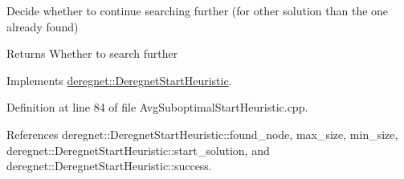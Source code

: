 Decide whether to continue searching further (for other solution than the one already found) 

\begin{DoxyReturn}{Returns}
Whether to search further 
\end{DoxyReturn}


Implements \hyperlink{classderegnet_1_1DeregnetStartHeuristic_ac3ee2c3022512f9d4ec7a6b49358e60a}{deregnet\+::\+Deregnet\+Start\+Heuristic}.



Definition at line 84 of file Avg\+Suboptimal\+Start\+Heuristic.\+cpp.



References deregnet\+::\+Deregnet\+Start\+Heuristic\+::found\+\_\+node, max\+\_\+size, min\+\_\+size, deregnet\+::\+Deregnet\+Start\+Heuristic\+::start\+\_\+solution, and deregnet\+::\+Deregnet\+Start\+Heuristic\+::success.


